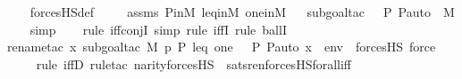 \begin{isabellebody}
%
\isadelimproof
\ \ %
\endisadelimproof
%
\isatagproof
{}\isamarkupfalse%
\ forcesHS{\isacharunderscore}{\kern0pt}def\ \isanewline
\ \ \isamarkupfalse%
\ assms\ P{\isacharunderscore}{\kern0pt}in{\isacharunderscore}{\kern0pt}M\ leq{\isacharunderscore}{\kern0pt}in{\isacharunderscore}{\kern0pt}M\ one{\isacharunderscore}{\kern0pt}in{\isacharunderscore}{\kern0pt}M\isanewline
\ \ \isamarkupfalse%
{\isacharparenleft}{\kern0pt}subgoal{\isacharunderscore}{\kern0pt}tac\ {\isachardoublequoteopen}{\isacharless}{\kern0pt}{\isasymF}{\isacharcomma}{\kern0pt}\ {\isasymG}{\isacharcomma}{\kern0pt}\ P{\isacharcomma}{\kern0pt}\ P{\isacharunderscore}{\kern0pt}auto{\isachargreater}{\kern0pt}\ {\isasymin}\ M{\isachardoublequoteclose}{\isacharparenright}{\kern0pt}\isanewline
\ \ \isamarkupfalse%
\ simp\isanewline
\ \ \ \isamarkupfalse%
{\isacharparenleft}{\kern0pt}rule\ iff{\isacharunderscore}{\kern0pt}conjI{}{\isacharcomma}{\kern0pt}\ simp{\isacharcomma}{\kern0pt}\ rule\ iffI{\isacharcomma}{\kern0pt}\ rule\ ballI{\isacharparenright}{\kern0pt}\isanewline
\ \ \ \ \isamarkupfalse%
{\isacharparenleft}{\kern0pt}rename{\isacharunderscore}{\kern0pt}tac\ x{\isacharcomma}{\kern0pt}\ subgoal{\isacharunderscore}{\kern0pt}tac\ {\isachardoublequoteopen}M{\isacharcomma}{\kern0pt}\ {\isacharbrackleft}{\kern0pt}p{\isacharcomma}{\kern0pt}\ P{\isacharcomma}{\kern0pt}\ leq{\isacharcomma}{\kern0pt}\ one{\isacharcomma}{\kern0pt}\ {\isasymlangle}{\isasymF}{\isacharcomma}{\kern0pt}\ {\isasymG}{\isacharcomma}{\kern0pt}\ P{\isacharcomma}{\kern0pt}\ P{\isacharunderscore}{\kern0pt}auto{\isasymrangle}{\isacharcomma}{\kern0pt}\ x{\isacharbrackright}{\kern0pt}\ {\isacharat}{\kern0pt}\ env\ {\isasymTurnstile}\ forcesHS{\isacharprime}{\kern0pt}{\isacharparenleft}{\kern0pt}{\isasymphi}{\isacharparenright}{\kern0pt}{\isachardoublequoteclose}{\isacharcomma}{\kern0pt}\ force{\isacharparenright}{\kern0pt}\isanewline
\ \ \ \ \isamarkupfalse%
{\isacharparenleft}{\kern0pt}rule\ iffD{}{\isacharcomma}{\kern0pt}\ rule{\isacharunderscore}{\kern0pt}tac\ n{\isacharequal}{\kern0pt}{\isachardoublequoteopen}arity{\isacharparenleft}{\kern0pt}forcesHS{\isacharprime}{\kern0pt}{\isacharparenleft}{\kern0pt}{\isasymphi}{\isacharparenright}{\kern0pt}{\isacharparenright}{\kern0pt}{\isachardoublequoteclose}\ \ sats{\isacharunderscore}{\kern0pt}ren{\isacharunderscore}{\kern0pt}forcesHS{\isacharunderscore}{\kern0pt}forall{\isacharunderscore}{\kern0pt}iff{\isacharparenright}{\kern0pt}\isanewline

\end{isabellebody}
